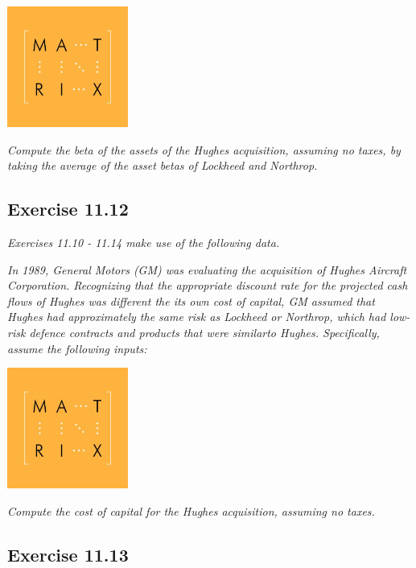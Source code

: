 \documentclass[]{book}
\theoremstyle{definition}
\theoremstyle{definition}
\theoremstyle{remark}
\begin{document}
\begin{center}\includegraphics[width=150px]{figures/matrix} \end{center}

\emph{Compute the beta of the assets of the Hughes acquisition, assuming
no taxes, by taking the average of the asset betas of Lockheed and
Northrop.} \citep[p.390]{book}

\subsection{Exercise 11.12}\label{exercise-11.12}

\emph{Exercises 11.10 - 11.14 make use of the following data.}
\citep[p.389]{book}

\emph{In 1989, General Motors (GM) was evaluating the acquisition of
Hughes Aircraft Corporation. Recognizing that the appropriate discount
rate for the projected cash flows of Hughes was different the its own
cost of capital, GM assumed that Hughes had approximately the same risk
as Lockheed or Northrop, which had low-risk defence contracts and
products that were similarto Hughes. Specifically, assume the following
inputs:} \citep[p.389]{book}

\begin{center}\includegraphics[width=150px]{figures/matrix} \end{center}

\emph{Compute the cost of capital for the Hughes acquisition, assuming
no taxes.} \citep[p.390]{book}

\subsection{Exercise 11.13}\label{exercise-11.13}
\end{document}
